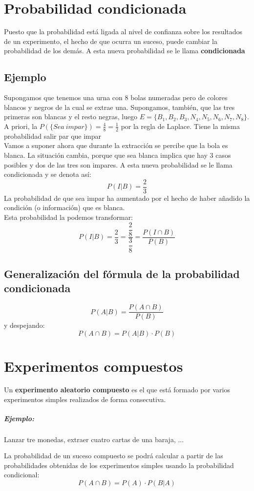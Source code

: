 \section{Probabilidad condicionada}

Puesto que la probabilidad está ligada al nivel de confianza sobre los resultados de un experimento, el hecho de que ocurra un suceso, puede cambiar la probabilidad de los demás. A esta nueva probabilidad se le llama \textbf{condicionada}
\subsection{Ejemplo}
 Supongamos que tenemos una urna con 8 bolas numeradas pero de colores blancos y negros de la cual se extrae una. Supongamos, también, que las tres primeras son blancas y el resto negras, luego  $E=\lbrace B_1,B_2, B_3, N_4, N_5, N_6, N_7, N_8\rbrace$.\\
 A priori, la $P(\lbrace Sea\ impar\rbrace )=\frac{4}{8}=\frac{1}{2}$ por la regla de Laplace. Tiene la misma probabilidad salir par que impar\\
 Vamos a suponer ahora que durante la extracción se percibe que la bola es blanca. La situación cambia, porque que sea blanca implica que hay 3 casos posibles y dos de las tres son impares. A esta nueva probabilidad se le llama  condicionada y se denota así:
 $$P(I|B)=\dfrac{2}{3}$$
La probabilidad de que sea impar ha aumentado por el hecho de haber añadido la condición (o información) que es blanca.\\
Esta probabilidad la podemos transformar:
 $$P(I|B)=\dfrac{2}{3}=\dfrac{\dfrac{2}{8}}{\dfrac{3}{8}}=\dfrac{P(I\cap B)}{P(B)}$$

\subsection{Generalización del fórmula de la probabilidad condicionada} $$P(A|B)=\dfrac{P(A\cap B)}{P(B)}$$
y despejando:
$$P(A\cap B) = P(A|B)\cdot P(B)$$

\section{Experimentos compuestos} Un \textbf{experimento aleatorio compuesto} es el que está formado por varios experimentos simples realizados de forma consecutiva.
\subparagraph{Ejemplo:}Lanzar tre monedas, extraer cuatro cartas de una baraja, ...

La probabilidad de un suceso compuesto se podrá calcular a partir de las probabilidades obtenidas de los experimentos simples usando la probabilidad condicional:
$$P(A\cap B) = P(A) \cdot P(B|A)$$

